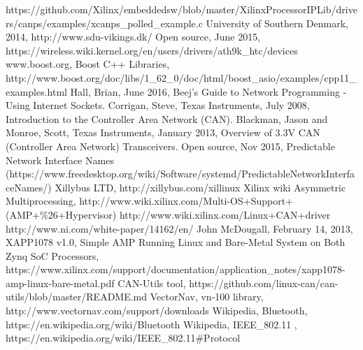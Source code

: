 \begin{thebibliography}{11} %
			https://github.com/Xilinx/embeddedsw/blob/master/XilinxProcessorIPLib/drivers/canps/examples/xcanps\_polled\_example.c
			University of Southern Denmark, 2014, http://www.sdu-vikings.dk/
			Open source, June 2015, https://wireless.wiki.kernel.org/en/users/drivers/ath9k\_htc/devices
			www.boost.org, Boost C++ Libraries, http://www.boost.org/doc/libs/1\_62\_0/doc/html/boost\_asio/examples/cpp11\_examples.html
			Hall, Brian, June 2016, Beej's Guide to Network Programming - Using Internet Sockets.
			Corrigan, Steve, Texas Instruments, July 2008, Introduction to the Controller Area Network (CAN).
			Blackman, Jason and Monroe, Scott, Texas Instruments, January 2013, Overview of 3.3V CAN (Controller Area Network) Transceivers.
			Open source, Nov 2015, Predictable Network Interface Names (https://www.freedesktop.org/wiki/Software/systemd/PredictableNetworkInterfaceNames/)
			Xillybus LTD, http://xillybus.com/xillinux
			Xilinx wiki Asymmetric Multiprocessing, http://www.wiki.xilinx.com/Multi-OS+Support+(AMP+\%26+Hypervisor)
			http://www.wiki.xilinx.com/Linux+CAN+driver
			http://www.ni.com/white-paper/14162/en/
			John McDougall, February 14, 2013, XAPP1078 v1.0, Simple AMP Running Linux and Bare-Metal System on Both Zynq SoC Processors, https://www.xilinx.com/support/documentation/application\_notes/xapp1078-amp-linux-bare-metal.pdf
			CAN-Utils tool, https://github.com/linux-can/can-utils/blob/master/README.md
			VectorNav, vn-100 library, http://www.vectornav.com/support/downloads
			Wikipedia, Bluetooth, https://en.wikipedia.org/wiki/Bluetooth
			Wikipedia, IEEE\_802.11 , https://en.wikipedia.org/wiki/IEEE\_802.11\#Protocol
\end{thebibliography}
